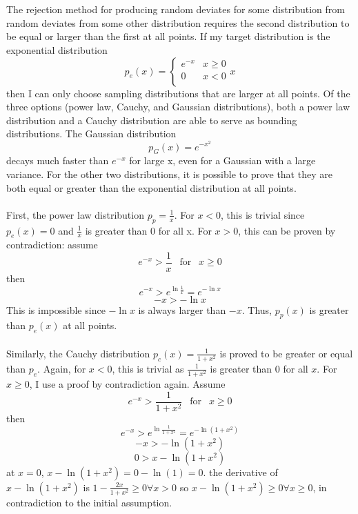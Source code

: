 \documentclass{article}
\newcommand{\<}[1]{\left\langle #1 \right\rangle }
\begin{document}
\section{}
The rejection method for producing random deviates for some distribution from random deviates from some other distribution requires the second distribution to be equal or larger than the first at all points. If my target distribution is the exponential distribution
\[
p_e(x) =  
\left\{
	\begin{array}{ll}
		e^{-x}  & x \geq 0\\
		0 & x < 0\\
	\end{array}
\right.x
\]
then I can only choose sampling distributions that are larger at all points. Of the three options (power law, Cauchy, and Gaussian distributions), both a power law distribution and a Cauchy distribution are able to serve as bounding distributions. The Gaussian distribution 
\[p_G(x) = e^{-x^2}\]
decays much faster than $e^{-x}$ for large x, even for a Gaussian with a large variance. For the other two distributions, it is possible to prove that they are both equal or greater than the exponential distribution at all points.\\
\\
First, the power law distribution $p_p = \frac{1}{x}$. For $x < 0$, this is trivial since $p_e(x) = 0$ and $\frac{1}{x}$ is greater than 0 for all x. For $x>0$, this can be proven by contradiction: assume
\[e^{-x} > \frac{1}{x} \ \ \text{ for } \ \ x \geq 0 \] 
then
\[e^{-x} > e^{\ln{\frac{1}{x}}} = e^{-\ln{x}}\]
\[-x > -\ln{x}\]
This is impossible since $-\ln{x}$ is always larger than $-x$. Thus, $p_p(x)$ is greater than $p_e(x)$ at all points.\\
\\
Similarly, the Cauchy distribution $p_c(x) = \frac{1}{1+x^2}$ is proved to be greater or equal than $p_e$. Again, for $x<0$, this is trivial as $\frac{1}{1+x^2}$ is greater than 0 for all $x$. For $x \geq 0$, I use a proof by contradiction again. Assume 
\[e^{-x} > \frac{1}{1+x^2} \ \ \text{ for } \ \ x \geq 0\]
then
\[e^{-x} > e^{\ln{\frac{1}{1+x^2}}} = e^{-\ln\left(1+x^2\right)}\]
\[-x > -\ln{\left(1+x^2\right)}\]
\[ 0 > x - \ln\left(1+x^2\right)\]
at $x=0$, $ x - \ln\left(1+x^2\right) =  0 - \ln\left(1\right) = 0$. the derivative of $ x - \ln\left(1+x^2\right)$ is $1 - \frac{2x}{1+x^2} \geq 0 \forall x>0$ so $ x - \ln\left(1+x^2\right) \geq 0 \forall x \geq 0$, in contradiction to the initial assumption.\\
\end{document}
